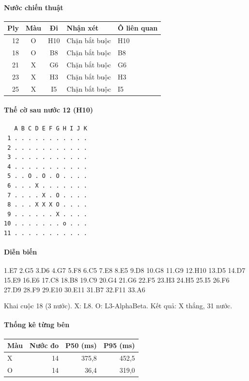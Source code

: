 \paragraph{Nước chiến thuật}
\begin{center}\small
\begin{tabular}{@{}rccll@{}}
\toprule
Ply & Màu & Đi & Nhận xét & Ô liên quan \\
\midrule
12 & O & H10 & Chặn bắt buộc & H10 \\
18 & O & B8 & Chặn bắt buộc & B8 \\
21 & X & G6 & Chặn bắt buộc & G6 \\
23 & X & H3 & Chặn bắt buộc & H3 \\
25 & X & I5 & Chặn bắt buộc & I5 \\
\bottomrule
\end{tabular}
\end{center}
\paragraph{Thế cờ sau nước 12 (H10)}
\begin{verbatim}
   A B C D E F G H I J K
 1 . . . . . . . . . . .
 2 . . . . . . . . . . .
 3 . . . . . . . . . . .
 4 . . . . . . . . . . .
 5 . . O . O . O . . . .
 6 . . . X . . . . . . .
 7 . . . . X . O . . . .
 8 . . . X X X O . . . .
 9 . . . . . . X . . . .
10 . . . . . . . o . . .
11 . . . . . . . . . . .
\end{verbatim}
\paragraph{Diễn biến}
{\footnotesize 1.E7 2.G5 3.D6 4.G7 5.F8 6.C5 7.E8 8.E5 9.D8 10.G8 11.G9 12.H10 13.D5 14.D7 15.E9 16.E6 17.C8 18.B8 19.C9 20.G4 21.G6 22.F5 23.H3 24.H5 25.I5 26.F6 27.D9 28.F9 29.E10 30.E11 31.B7 32.F11 33.A6\par}
Khai cuộc 18 (3 nước). X: L8. O: L3-AlphaBeta. Kết quả: X thắng, 31 nước.
\paragraph{Thống kê từng bên}
\begin{center}\small
\begin{tabular}{@{}lrrr@{}}
\toprule
Màu & Nước đo & P50 (ms) & P95 (ms) \\
\midrule
X & 14 & 375,8 & 452,5 \\
O & 14 & 36,4 & 319,0 \\
\bottomrule
\end{tabular}
\end{center}
